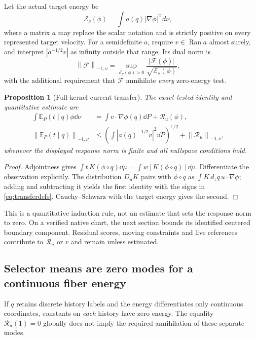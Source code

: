 \documentclass[11pt,letterpaper]{article}
\newtheorem{proposition}[theorem]{Proposition}
\theoremstyle{remark}\newtheorem{remark}[theorem]{Remark}
\newcommand{\E}{\mathbb E}
\newcommand{\norm}[1]{\left\lVert#1\right\rVert}
\newcommand{\cE}{\mathcal E}
\begin{document}
Let the actual target energy be
\[
 \cE_\nu(\phi)=\int a(q)|\nabla\phi|^2\,d\nu,
\]
where a matrix $a$ may replace the scalar notation and is strictly positive on every represented target velocity. For a semidefinite $a$, require $v\in\operatorname{Ran}a$ almost surely, and interpret $|a^{-1/2}v|$ as infinity outside that range. Its dual norm is
\[
 \norm{\mathcal F}_{-1,\nu}
 =
 \sup_{\cE_\nu(\phi)>0}
 \frac{|\mathcal F(\phi)|}{\sqrt{\cE_\nu(\phi)}},
\]
with the additional requirement that $\mathcal F$ annihilate \emph{every} zero-energy test.

\begin{proposition}[Full-kernel current transfer]\label{prop:transfer}
The exact tested identity and quantitative estimate are
\begin{align}\label{eq:transfer}
 \int \E_P(t\mid q)\phi\dd\nu
 &=\int v\cdot\nabla\phi(q)\dd P+\mathcal R_u(\phi),\\
 \norm{\E_P(t\mid q)}_{-1,\nu}
 &\le
 \left(\int|a(q)^{-1/2}v|^2\dd P\right)^{1/2}
 +\norm{\mathcal R_u}_{-1,\nu},\nonumber
\end{align}
whenever the displayed response norm is finite and all nullspace conditions hold.
\end{proposition}
\begin{proof}
Adjointness gives
$\int t\,K(\phi\circ q)\dd\mu=\int w[K(\phi\circ q)]\dd\mu$.
Differentiate the observation explicitly. The distribution $D_uK$ pairs with $\phi\circ q$ as $\int K\,d_zq\,u\cdot\nabla\phi$; adding and subtracting it yields the first identity with the signs in \eqref{eq:transferdefs}. Cauchy--Schwarz with the target energy gives the second.
\end{proof}

This is a quantitative induction rule, not an estimate that sets the response norm to zero. On a verified native chart, the next section bounds its identified centered boundary component. Residual scores, moving constraints and live references contribute to $\mathcal R_u$ or $v$ and remain unless estimated.

\subsection{Selector means are zero modes for a continuous fiber energy}

If $q$ retains discrete history labels and the energy differentiates only continuous coordinates, constants on \emph{each} history have zero energy. The equality $\mathcal R_u(1)=0$ globally does not imply the required annihilation of these separate modes.
\end{document}
